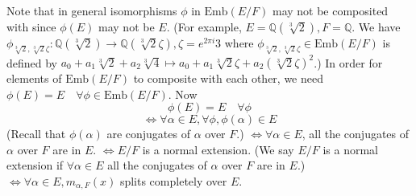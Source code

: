 \documentclass{article}
\theoremstyle{definition}
\begin{document}
Note that in general isomorphisms $\phi$ in $\text{Emb}(E/F)$ may not be composited with since $\phi(E)$ may not be $E$.
(For example, $E = \mathbb{Q}(\sqrt[3]{2}), F = \mathbb{Q}$.
We have $\phi_{\sqrt[3]{2}, \sqrt[3]{2} \zeta}: \mathbb{Q}(\sqrt[3]{2}) \to \mathbb{Q}(\sqrt[3]{2} \zeta), \zeta = e^{2 \pi i}{3}$ where $\phi_{\sqrt[3]{2}, \sqrt[3]{2} \zeta} \in \text{Emb}(E/F)$ is defined by $a_0 + a_1 \sqrt[3]{2} + a_2 \sqrt[3]{4} \mapsto a_0 + a_1 \sqrt[3]{2} \zeta + a_2 (\sqrt[3]{2} \zeta)^2$.)
In order for elements of $\text{Emb}(E/F)$ to composite with each other, we need $\phi(E) = E \quad \forall \phi \in \text{Emb}(E/F)$.
Now 
\[
	\phi(E) = E \quad \forall \phi
\]
\[
	\Leftrightarrow \forall \alpha \in E, \forall \phi, \phi(\alpha) \in E
\]
(Recall that $\phi(\alpha)$ are conjugates of $\alpha$ over $F$.) 
$\Leftrightarrow \forall \alpha \in E$, all the conjugates of $\alpha$ over $F$ are in $E$.
$\Leftrightarrow E/F$ is a normal extension. 
(We say $E/F$ is a normal extension if $\forall \alpha \in E$ all the conjugates of $\alpha$ over $F$ are in $E$.)
$\Leftrightarrow \forall \alpha \in E, m_{\alpha, F}(x)$ splits completely over $E$.
\end{document}
